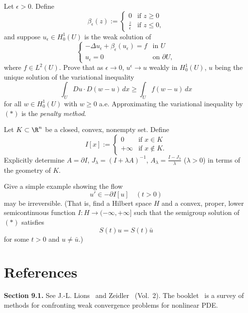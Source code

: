 \begin{exercise}
Let $\epsilon > 0$. Define
\[
\beta_\epsilon(z) := \begin{cases} 0 & \text{if } z \ge 0 \\ \frac{z}{\epsilon} & \text{if } z \le 0, \end{cases}
\]
and suppose $u_\epsilon \in H^1_0(U)$ is the weak solution of
\[
\begin{cases}
-\Delta u_\epsilon + \beta_\epsilon(u_\epsilon) = f & \text{in } U \\
u_\epsilon = 0 & \text{on } \partial U,
\end{cases}
\tag{$*$}
\]
where $f \in L^2(U)$. Prove that as $\epsilon \to 0$, $u^\epsilon \to u$ weakly in $H^1_0(U)$, $u$ being the unique solution of the variational inequality
\[
\int_U Du \cdot D(w - u) \, dx \ge \int_U f(w - u) \, dx
\]
for all $w \in H^1_0(U)$ with $w \ge 0$ a.e. Approximating the variational inequality by $(*)$ is the \textit{penalty method}.
\end{exercise}

\begin{exercise}
Let $K \subset \R^n$ be a closed, convex, nonempty set. Define
\[
I[x] := \begin{cases} 0 & \text{if } x \in K \\ +\infty & \text{if } x \notin K. \end{cases}
\]
Explicitly determine $A = \partial I$, $J_\lambda = (I + \lambda A)^{-1}$, $A_\lambda = \frac{I-J_\lambda}{\lambda}$ ($\lambda > 0$) in terms of the geometry of $K$.
\end{exercise}

\begin{exercise}
Give a simple example showing the flow
\[
u' \in -\partial I[u] \quad (t > 0)
\tag{$*$}
\]
may be irreversible. (That is, find a Hilbert space $H$ and a convex, proper, lower semicontinuous function $I : H \to (-\infty, +\infty]$ such that the semigroup solution of $(*)$ satisfies
\[
S(t)u = S(t)\bar{u}
\]
for some $t > 0$ and $u \neq \bar{u}$.)
\end{exercise}

\section{References}
\label{sec:references-ch9}

\noindent\textbf{Section 9.1.} See J.-L. Lions~\cite{Lions1969} and Zeidler~\cite{Zeidler1985} (Vol.~2). The booklet~\cite{Evans1990} is a survey of methods for confronting weak convergence problems for nonlinear PDE.

